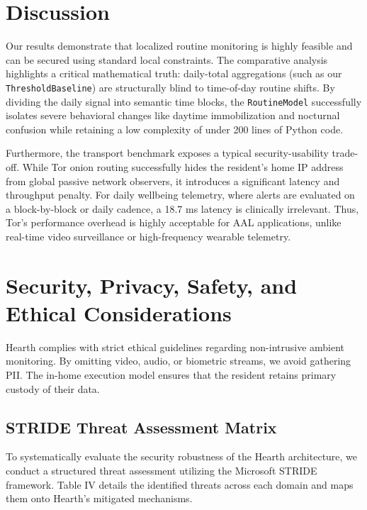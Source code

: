\documentclass[conference]{IEEEtran}
\begin{document}
\section{Discussion}

Our results demonstrate that localized routine monitoring is highly feasible and can be secured using standard local constraints. The comparative analysis highlights a critical mathematical truth: daily-total aggregations (such as our \texttt{ThresholdBaseline}) are structurally blind to time-of-day routine shifts. By dividing the daily signal into semantic time blocks, the \texttt{RoutineModel} successfully isolates severe behavioral changes like daytime immobilization and nocturnal confusion while retaining a low complexity of under 200 lines of Python code.

Furthermore, the transport benchmark exposes a typical security-usability trade-off. While Tor onion routing successfully hides the resident's home IP address from global passive network observers, it introduces a significant latency and throughput penalty. For daily wellbeing telemetry, where alerts are evaluated on a block-by-block or daily cadence, a 18.7 ms latency is clinically irrelevant. Thus, Tor's performance overhead is highly acceptable for AAL applications, unlike real-time video surveillance or high-frequency wearable telemetry.

\section{Security, Privacy, Safety, and Ethical Considerations}

Hearth complies with strict ethical guidelines regarding non-intrusive ambient monitoring. By omitting video, audio, or biometric streams, we avoid gathering PII. The in-home execution model ensures that the resident retains primary custody of their data.

\subsection{STRIDE Threat Assessment Matrix}
To systematically evaluate the security robustness of the Hearth architecture, we conduct a structured threat assessment utilizing the Microsoft STRIDE framework. Table IV details the identified threats across each domain and maps them onto Hearth's mitigated mechanisms.
\end{document}
